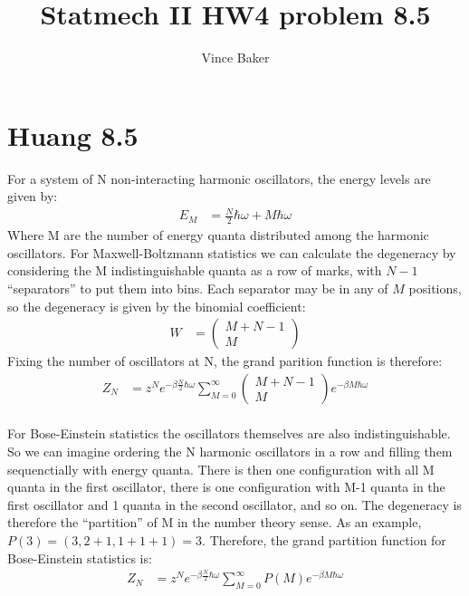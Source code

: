 \documentclass[a4paper,11pt]{article}
\title{Statmech II HW4 problem 8.5}
\author{Vince Baker}
\numberwithin{equation}{section}
\begin{document}
\maketitle

\section{Huang 8.5}
For a system of N non-interacting harmonic oscillators, the energy levels are given by:
\begin{align}
 E_M &= \frac{N}{2}\hbar \omega + M\hbar \omega
\end{align}
Where M are the number of energy quanta distributed among the harmonic oscillators. 
For Maxwell-Boltzmann statistics we can calculate the degeneracy by considering the M indistinguishable quanta as a row of marks, with $N-1$ ``separators'' to put them into bins.
Each separator may be in any of $M$ positions, so the degeneracy is given by the binomial coefficient:
\begin{align}
 W &= \begin{pmatrix}
       M+N-1 \\
       M
      \end{pmatrix}
\end{align}
Fixing the number of oscillators at N, the grand parition function is therefore:
\begin{align}
 Z_N &= z^Ne^{-\beta\frac{N}{2}\hbar \omega}\sum_{M=0}^\infty \begin{pmatrix}
       M+N-1 \\
       M
      \end{pmatrix} e^{-\beta M\hbar \omega}
\end{align}
\\
For Bose-Einstein statistics the oscillators themselves are also indistinguishable. 
So we can imagine ordering the N harmonic oscillators in a row and filling them sequenctially with energy quanta.
There is then one configuration with all M quanta in the first oscillator, there is one configuration with M-1 quanta in the first oscillator and 1 quanta in the second oscillator, and so on.
The degeneracy is therefore the ``partition'' of M in the number theory sense. As an example, $P(3) = (3, 2+1, 1+1+1) = 3$.
Therefore, the grand partition function for Bose-Einstein statistics is:
\begin{align}
 Z_N &= z^Ne^{-\beta\frac{N}{2}\hbar \omega}\sum_{M=0}^\infty P(M) e^{-\beta M\hbar \omega}
\end{align}
\end{document}
